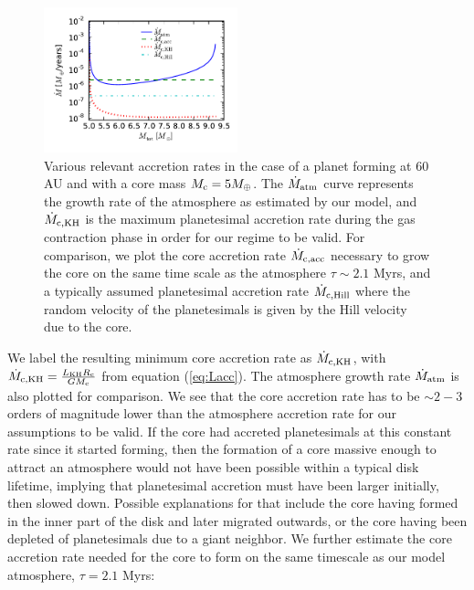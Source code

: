 \documentclass[apj]{emulateapj}
\newcommand{\co}{_{\rm c}}
\begin{document}
 \begin{figure}[h]
\centering
\includegraphics[width=0.5\textwidth]{../../figs/ModelAtmospheres/RadSelfGravRealEOS/PaperFigs/acc_rates_paper.pdf}
\caption{Various relevant accretion rates in the case of a planet forming at 60 AU and with a core mass $M\co=5 M_{\oplus}$. The $\dot{M}_{\rm{atm}}$ curve represents the growth rate of the atmosphere as estimated by our model, and $\dot{M}_{\rm{c,KH}}$ is the maximum planetesimal accretion rate during the gas contraction phase in order for our regime to be valid. For comparison, we plot the core accretion rate $\dot{M}_{\rm{c,acc}}$ necessary to grow the core on the same time scale as the atmosphere $\tau \sim 2.1$ Myrs, and a typically assumed planetesimal accretion rate $\dot{M}_{\rm{c,Hill}}$ where the random velocity of the planetesimals is given by the Hill velocity due to the core.}
\label{fig:accrates}
\end{figure}

We label the resulting minimum core accretion rate as $\dot{M}_{\rm{c,KH}}$, with  $\dot{M}_{\rm{c,KH}}=\frac{L_{\rm{KH}} R\co}{G M\co}$ from equation (\ref{eq:Lacc}). The atmosphere growth rate $\dot{M}_{\rm{atm}}$ is also plotted for comparison. We see that the core accretion rate has to be $\sim2-3$ orders of magnitude lower than the atmosphere accretion rate for our assumptions to be valid.  If the core had accreted planetesimals at this constant rate since it started forming, then the formation of a core massive enough to attract an atmosphere would not have been possible within a typical disk lifetime, implying that planetesimal accretion must have been larger initially, then slowed down. Possible explanations for that include the core having formed in the inner part of the disk and later migrated outwards, or the core having been depleted of planetesimals due to a giant neighbor. We further estimate the core accretion rate needed for the core to form on the same timescale as our model atmosphere, $\tau=2.1$ Myrs:
\end{document}
